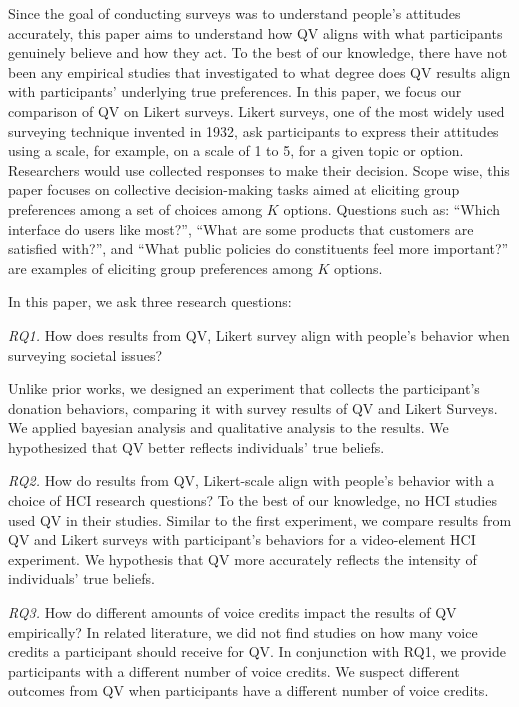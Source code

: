 Since the goal of conducting surveys was to understand people's attitudes accurately, this paper aims to understand how QV aligns with what participants genuinely believe and how they act. To the best of our knowledge, there have not been any empirical studies that investigated to what degree does QV results align with participants' underlying true preferences. In this paper, we focus our comparison of QV on Likert surveys. Likert surveys, one of the most widely used surveying technique invented in 1932, ask participants to express their attitudes using a scale, for example, on a scale of 1 to 5, for a given topic or option. Researchers would use collected responses to make their decision. Scope wise, this paper focuses on collective decision-making tasks aimed at eliciting group preferences among a set of choices among $K$ options. Questions such as: ``Which interface do users like most?'', ``What are some products that customers are satisfied with?'', and  ``What public policies do constituents feel more important?'' are examples of eliciting group preferences among $K$ options.

In this paper, we ask three research questions: 

\textit{RQ1.} How does results from QV, Likert survey align with people's behavior when surveying societal issues? 

Unlike prior works, we designed an experiment that collects the participant's donation behaviors, comparing it with survey results of QV and Likert Surveys. We applied bayesian analysis and qualitative analysis to the results. We hypothesized that QV better reflects individuals' true beliefs. 

\textit{RQ2.} How do results from QV, Likert-scale align with people's behavior with a choice of HCI research questions? 
To the best of our knowledge, no  HCI studies used QV in their studies. Similar to the first experiment, we compare results from QV and Likert surveys with participant's behaviors for a video-element HCI experiment. We hypothesis that QV more accurately reflects the intensity of individuals' true beliefs. 

\textit{RQ3.} How do different amounts of voice credits impact the results of QV empirically?
In related literature, we did not find studies on how many voice credits a participant should receive for QV. In conjunction with RQ1, we provide participants with a different number of voice credits. We suspect different outcomes from QV when participants have a different number of voice credits.


